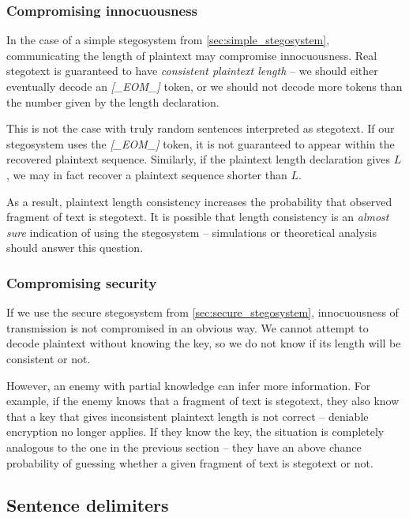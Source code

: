 \documentclass[draft]{IIBproject}
\DeclareRobustCommand{\ngram}[1]{\emph{[#1]}}
\begin{document}
\subsubsection{Compromising innocuousness}

In the case of a simple stegosystem from \cref{sec:simple_stegosystem}, communicating the length of plaintext may compromise innocuousness. Real stegotext is guaranteed to have \emph{consistent plaintext length} -- we should either eventually decode an \ngram{\_EOM\_} token, or we should not decode more tokens than the number given by the length declaration.

This is not the case with truly random sentences interpreted as stegotext. If our stegosystem uses the \ngram{\_EOM\_} token, it is not guaranteed to appear within the recovered plaintext sequence. Similarly, if the plaintext length declaration gives $L$, we may in fact recover a plaintext sequence shorter than $L$.

As a result, plaintext length consistency increases the probability that observed fragment of text is stegotext. It is possible that length consistency is an \emph{almost sure} indication of using the stegosystem -- simulations or theoretical analysis should answer this question.

\subsubsection{Compromising security}

If we use the secure stegosystem from \cref{sec:secure_stegosystem}, innocuousness of transmission is not compromised in an obvious way. We cannot attempt to decode plaintext without knowing the key, so we do not know if its length will be consistent or not.

However, an enemy with partial knowledge can infer more information. For example, if the enemy knows that a fragment of text is stegotext, they also know that a key that gives inconsistent plaintext length is not correct -- deniable encryption no longer applies. If they know the key, the situation is completely analogous to the one in the previous section -- they have an above chance probability of guessing whether a given fragment of text is stegotext or not.

\subsection{Sentence delimiters}
\end{document}
